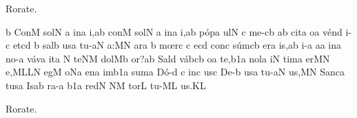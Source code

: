 \bigskip

Rorate.

\bigskip


\initiumgregorianum
\znotes\fissum{1pt}\bmolle b\en
%
\sgn Con\punctum M\egn
\sgn so{l}\punctum N\egn
{}\punctum a\egn
\sgn {}i{n}\punctum a\egn
\sgn {}i,\punctum a\augmentum b\egn
\spatium
\begingroup
\bgenerale
\sgn con\punctum M\egn
\sgn so{l}\punctum N\egn
{}\punctum a\egn
\sgn {}i{n}\punctum a\egn
\sgn {}i,\punctum a\augmentum b\egn
\spatium
\sgn p{\'o}{p}\punctum a\egn
\sgn {}u{l}\punctum N\egn
{}\punctum c\egn
\spatium
\sgn m{e}{-}\clivis cb\egn
{}\punctum a\augmentum b\egn
\spatium
\divisiominor
\spatium
\sgn c{i}{t}\punctum a\egn
\sgn {}o{}\punctum a\egn
\spatium
\sgn v{\'e}{n}\punctum d\egn
\sgn {}i{-}\punctum c\egn
\sgn {}et\punctum c\augmentum d\egn
\spatium
\custos b
\lineaproxima
\sgn s{a}{l}\punctum b\egn
\sgn {}us\punctum a\egn
\spatium
\sgn t{u}{-}\clivis aN\egn
\sgn {}a:\punctum M\augmentum N\egn
\spatium
\divisiomaior
\spatium
{}a{r}\punctum a\egn
{}\punctum b\egn
\spatium
\sgn m{\oe}{r}\punctum c\egn
{}\punctum c\egn
\sgn {}e{}\pes cd\egn
\spatium
\sgn con\punctum c\egn
\sgn s{\'u}{m}\clivis cb\egn
\sgn {}e{r}\punctum a\egn
\sgn {}i{s,}\punctum a\augmentum b\egn
\spatium
\divisiominor
\spatium
{}i{-}\punctum a\egn
\sgn {}a{}\punctum a\egn
\spatium
\sgn {}in\punctum a\egn
\sgn no{-}\punctum a\egn
\sgn v{\'a}{v}\punctum a\egn
\sgn {}it\punctum a\egn
\spatium
\custos N
\lineaproxima
\sgn t{e}{}\clivis NM\egn
\spatium
\sgn d{o}{l}\pes Mb\egn
\sgn {}o{r?}\punctum a\augmentum b\egn
\spatium
\divisiomaior
\spatium
\sgn Sal\punctum d\egn
\sgn v{\'a}{b}\clivis cb\egn
\sgn {}o{}\engl{}\punctum a\egn
\spatium
\sgn te{,}\episem b1\punctum a\egn
\spatium
\divisiominima
\spatium
\sgn no{l}\punctum a\egn
\sgn {}i{}\punctum N\egn
\spatium
\sgn ti{m}\punctum a\egn
\sgn {}e{r}\pes MN\egn
\sgn {}e{,}\clivis ML\augmentumduplex LN\egn
\spatium
\divisiomaior
\spatium
\sgn {}e{g}\punctum M\egn
\sgn {}o{}\pes Na\egn
\spatium
\sgn {}e{n}\punctum a\egn
\sgn {}im\episem b1\punctum a\egn
\spatium
\sgn sum\punctum a\egn
\spatium
\sgn D{\'o}{-}\punctum d\egn
\custos c
\lineaproxima
{}i{n}\punctum c\egn
\sgn {}us\punctum c\egn
\spatium
\sgn De{-}\punctum b\egn
\sgn {}us\punctum a\egn
\spatium
\sgn t{u}{-}\clivis aN\egn
\sgn {}u{s,}\punctum M\augmentum N\egn
\spatium
\divisiominor
\spatium
\sgn Sa{nc}\punctum a\egn
\sgn tus\punctum a\egn
\spatium
\sgn {}Is\pes ab\egn
\sgn ra{-}\punctum a\egn
{}\episem b1\punctum a\egn
\spatium
\sgn re{d}\punctum N\egn
{}\clivis NM\egn
\sgn tor\punctum L\egn
\spatium
\sgn t{u}{-}\clivis ML\egn
\sgn {}u{s.}\punctum K\augmentum L\egn
\endgroup
\Finisgregoriana

\bigskip

Rorate.

